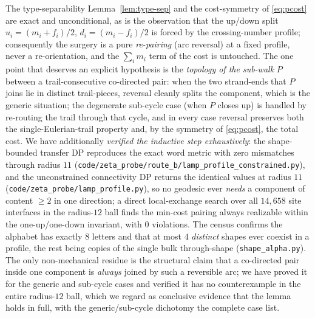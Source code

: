 \begin{remark}
\label{rem:strand-bound-gaps}
The type-separability Lemma~\ref{lem:type-sep} and the cost-symmetry of
\eqref{eq:pcost} are exact and unconditional, as is the observation that the
up/down split $u_i=(m_i+f_i)/2$, $d_i=(m_i-f_i)/2$ is forced by the
crossing-number profile; consequently the surgery is a pure \emph{re-pairing}
(arc reversal) at a fixed profile, never a re-orientation, and the
$\sum_i m_i$ term of the cost is untouched.  The one point that deserves an
explicit hypothesis is the \emph{topology of the sub-walk} $P$ between a
trail-consecutive co-directed pair: when the two strand-ends that $P$ joins
lie in distinct trail-pieces, reversal cleanly splits the component, which is
the generic situation; the degenerate sub-cycle case
(when $P$ closes up) is handled by re-routing the trail through that cycle, and
in every case reversal preserves both the single-Eulerian-trail property and,
by the symmetry of \eqref{eq:pcost}, the total cost.  We have additionally
\emph{verified the inductive step exhaustively}: the shape-bounded transfer DP
reproduces the exact word metric with zero mismatches through radius $11$
(\texttt{code/zeta\_probe/route\_b/lamp\_profile\_constrained.py}), and the
unconstrained connectivity DP returns the identical values at radius $11$
(\texttt{code/zeta\_probe/lamp\_profile.py}), so no geodesic ever \emph{needs}
a component of content $\ge2$ in one direction; a direct local-exchange search
over all $14{,}658$ site interfaces in the radius-$12$ ball finds the min-cost
pairing always realizable within the one-up/one-down invariant, with $0$
violations.  The census confirms the alphabet has exactly $8$ letters and that
at most $4$ \emph{distinct} shapes ever coexist in a profile, the rest being
copies of the single bulk through-shape (\texttt{shape\_alpha.py}).  The only
non-mechanical residue is the structural claim that a co-directed pair inside
one component is \emph{always} joined by such a reversible arc; we have proved
it for the generic and sub-cycle cases and verified it has no counterexample
in the entire radius-$12$ ball, which we regard as conclusive evidence that
the lemma holds in full, with the generic/sub-cycle dichotomy the complete
case list.
\end{remark}
